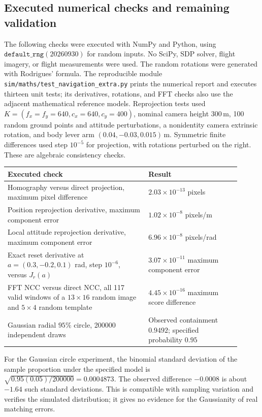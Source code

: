 \subsection{Executed numerical checks and remaining validation}

The following checks were executed with NumPy and Python, using
$\texttt{default\_rng}(20260930)$ for random inputs. No SciPy, SDP solver,
flight imagery, or flight measurements were used. The random rotations
were generated with Rodrigues' formula. The reproducible module
\texttt{sim/maths/test\_navigation\_extra.py} prints the numerical report
and executes thirteen unit tests; its derivatives, rotations, and FFT
checks also use the adjacent mathematical reference models. Reprojection tests used
$K=(f_x=f_y=640,c_x=640,c_y=400)$, nominal camera height $300\,\mathrm m$,
100 random ground points and attitude perturbations, a nonidentity
camera extrinsic rotation, and body lever arm $(0.04,-0.03,0.015)\,\mathrm m$.
Symmetric finite differences used step $10^{-5}$ for projection, with
rotations perturbed on the right. These are algebraic consistency checks.

\begin{center}
\begin{tabular}{@{}p{0.55\linewidth}p{0.36\linewidth}@{}}
\toprule
Executed check & Result\\
\midrule
Homography versus direct projection, maximum pixel difference
 & $2.03\times10^{-13}$ pixels\\
Position reprojection derivative, maximum component error
 & $1.02\times10^{-8}$ pixels/m\\
Local attitude reprojection derivative, maximum component error
 & $6.96\times10^{-8}$ pixels/rad\\
Exact reset derivative at $a=(0.3,-0.2,0.1)$ rad,
step $10^{-6}$, versus $J_r(a)$
 & $3.07\times10^{-11}$ maximum component error\\
FFT NCC versus direct NCC, all 117 valid windows of a
$13\times16$ random image and $5\times4$ random template
 & $4.45\times10^{-16}$ maximum score difference\\
Gaussian radial $95\%$ circle, 200000 independent draws
 & Observed containment $0.9492$; specified probability $0.95$\\
\bottomrule
\end{tabular}
\end{center}

For the Gaussian circle experiment, the binomial standard deviation of
the sample proportion under the specified model is
$\sqrt{0.95(0.05)/200000}=0.0004873$. The observed difference $-0.0008$
is about $-1.64$ such standard deviations. This is compatible with
sampling variation and verifies the simulated distribution; it gives
no evidence for the Gaussianity of real matching errors.


